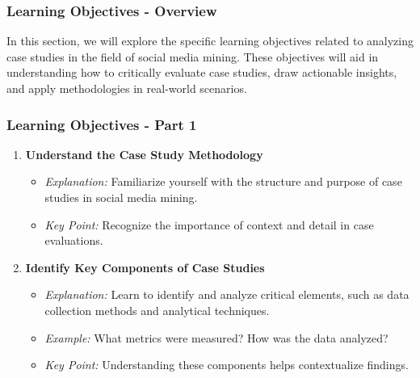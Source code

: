 \documentclass{beamer}
\begin{document}
\begin{frame}[fragile]
    \frametitle{Learning Objectives - Overview}
    In this section, we will explore the specific learning objectives related to analyzing case studies in the field of social media mining. 
    These objectives will aid in understanding how to critically evaluate case studies, draw actionable insights, and apply methodologies in real-world scenarios.
\end{frame}

\begin{frame}[fragile]
    \frametitle{Learning Objectives - Part 1}
    \begin{enumerate}
        \item \textbf{Understand the Case Study Methodology}
        \begin{itemize}
            \item \textit{Explanation:} Familiarize yourself with the structure and purpose of case studies in social media mining.
            \item \textit{Key Point:} Recognize the importance of context and detail in case evaluations.
        \end{itemize}

        \item \textbf{Identify Key Components of Case Studies}
        \begin{itemize}
            \item \textit{Explanation:} Learn to identify and analyze critical elements, such as data collection methods and analytical techniques.
            \item \textit{Example:} What metrics were measured? How was the data analyzed?
            \item \textit{Key Point:} Understanding these components helps contextualize findings.
        \end{itemize}
    \end{enumerate}
\end{frame}
\end{document}
